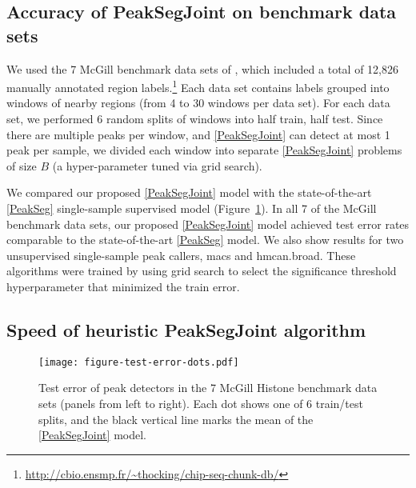 \documentclass{article} %
\begin{document}
\subsection{Accuracy of PeakSegJoint on benchmark data sets}

We used the 7 McGill benchmark data sets of
\citet{hocking2014visual}, which included a total of 12,826 manually
annotated
region labels.\footnote{\url{http://cbio.ensmp.fr/~thocking/chip-seq-chunk-db/}}
Each data set contains labels grouped into windows of nearby regions
(from 4 to 30 windows per data set). For each data set, we performed 6
random splits of windows into half train, half test. Since there are
multiple peaks per window, and \ref{PeakSegJoint} can detect at most 1
peak per sample, we divided each window into separate
\ref{PeakSegJoint} problems of size $B$ (a hyper-parameter tuned via
grid search).

We compared our proposed \ref{PeakSegJoint} model with the
state-of-the-art \ref{PeakSeg} single-sample supervised model
(Figure~\ref{fig:test-error-dots}). In all 7 of the McGill benchmark
data sets, our proposed \ref{PeakSegJoint} model achieved test error
rates comparable to the state-of-the-art \ref{PeakSeg} model. We also
show results for two unsupervised single-sample %
peak callers, macs and hmcan.broad. These algorithms were trained by
using grid search to select the significance threshold hyperparameter
that minimized the train error.


\subsection{Speed of heuristic PeakSegJoint algorithm}

\begin{figure}[b!]
  \centering
  \texttt{[image: figure-test-error-dots.pdf]}
  \vskip -0.5cm
  \caption{Test error of peak detectors in the 7 McGill Histone
    benchmark data sets (panels from left to right). Each dot shows
    one of 6 train/test splits, and the black vertical line marks the
    mean of the \ref{PeakSegJoint} model.}
  \label{fig:test-error-dots}
\end{figure}
\end{document}
